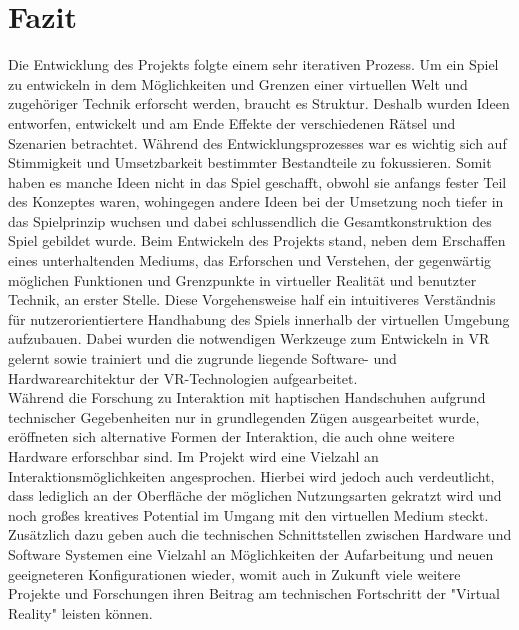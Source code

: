 \newpage
\chapter{Fazit}
Die Entwicklung des Projekts folgte einem sehr iterativen Prozess. Um ein Spiel zu entwickeln in dem Möglichkeiten und Grenzen einer virtuellen Welt und zugehöriger Technik erforscht werden, braucht es Struktur. Deshalb wurden Ideen entworfen, entwickelt und am Ende Effekte der verschiedenen Rätsel und Szenarien betrachtet. Während des Entwicklungsprozesses war es wichtig sich auf Stimmigkeit und Umsetzbarkeit bestimmter Bestandteile zu fokussieren. Somit haben es manche Ideen nicht in das Spiel geschafft, obwohl sie anfangs fester Teil des Konzeptes waren, wohingegen andere Ideen bei der Umsetzung noch tiefer in das Spielprinzip wuchsen und dabei schlussendlich die Gesamtkonstruktion des Spiel gebildet wurde. Beim Entwickeln des Projekts stand, neben dem Erschaffen eines unterhaltenden Mediums, das Erforschen und Verstehen, der gegenwärtig möglichen Funktionen und Grenzpunkte in virtueller Realität und benutzter Technik, an erster Stelle. Diese Vorgehensweise half ein intuitiveres Verständnis für nutzerorientiertere Handhabung des Spiels innerhalb der virtuellen Umgebung aufzubauen. Dabei wurden die notwendigen Werkzeuge zum Entwickeln in VR gelernt sowie trainiert und die zugrunde liegende Software- und Hardwarearchitektur der VR-Technologien aufgearbeitet.\\ 

\noindent Während die Forschung zu Interaktion mit haptischen Handschuhen aufgrund technischer Gegebenheiten nur in grundlegenden Zügen ausgearbeitet wurde, eröffneten sich alternative Formen der Interaktion, die auch ohne weitere Hardware erforschbar sind. Im Projekt wird eine Vielzahl an Interaktionsmöglichkeiten angesprochen. Hierbei wird jedoch auch verdeutlicht, dass lediglich an der Oberfläche der möglichen Nutzungsarten gekratzt wird und noch großes kreatives Potential im Umgang mit den virtuellen Medium steckt. Zusätzlich dazu geben auch die technischen Schnittstellen zwischen Hardware und Software Systemen eine Vielzahl an Möglichkeiten der Aufarbeitung und neuen geeigneteren Konfigurationen wieder, womit auch in Zukunft viele weitere Projekte und Forschungen ihren Beitrag am technischen Fortschritt der "Virtual Reality" leisten können.
